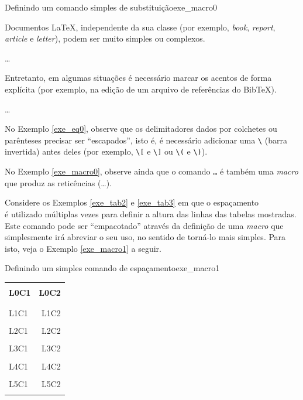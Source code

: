 \begin{texexptitled}[breakable,center lower,enhanced,middle=2mm]{Definindo um comando simples de substituição}{exe_macro0}
\newcommand{\eg}{por exemplo}
\newcommand{\ie}{isto é}

Documentos \LaTeX{}, independente da sua classe (\eg, \textit{book}, 
\textit{report}, \textit{article} e \textit{letter}), podem ser muito simples ou complexos.

\dots

Entretanto, em algumas situações é necessário marcar os acentos de forma explícita (\eg, na edição de um arquivo de referências do BibTeX). 

\dots

No Exemplo \ref{exe_eq0}, observe que os delimitadores dados por colchetes ou parênteses precisar ser ``escapados'', \ie, é necessário adicionar uma \verb|\| (barra invertida) antes deles (\eg, \verb|\[| e \verb|\]| ou \verb|\(| e \verb|\)|). 
\end{texexptitled}

\begin{marker}
No Exemplo \ref{exe_macro0}, observe ainda que o comando \texttt{\dots} é também uma \textit{macro} que produz as reticências (\dots).
\end{marker}

Considere os Exemplos \ref{exe_tab2} e \ref{exe_tab3} em que o espaçamento \texttt{\\[-0.5em]} é utilizado múltiplas vezes para definir a altura das linhas das tabelas mostradas. Este comando pode ser ``empacotado'' através da definição de uma \textit{macro} que simplesmente irá abreviar o seu uso, no sentido de torná-lo mais simples. Para isto, veja o Exemplo \ref{exe_macro1} a seguir.

\begin{texexptitled}[breakable,center lower,enhanced,middle=2mm,listing side text]{Definindo um simples comando de espaçamento}{exe_macro1}
\newcommand{\recuo}{\\[-0.5em]}

\begin{tabular}{l r}
\hline 
\recuo
\textbf{L0C1} & \textbf{L0C2} \\
\recuo
\hline
\recuo
L1C1 & L1C2 \\
\recuo
L2C1 & L2C2 \\
\recuo
L3C1 & L3C2 \\
\recuo
L4C1 & L4C2 \\
\recuo
L5C1 & L5C2 \\
\recuo
\hline
\end{tabular}
\end{texexptitled}

